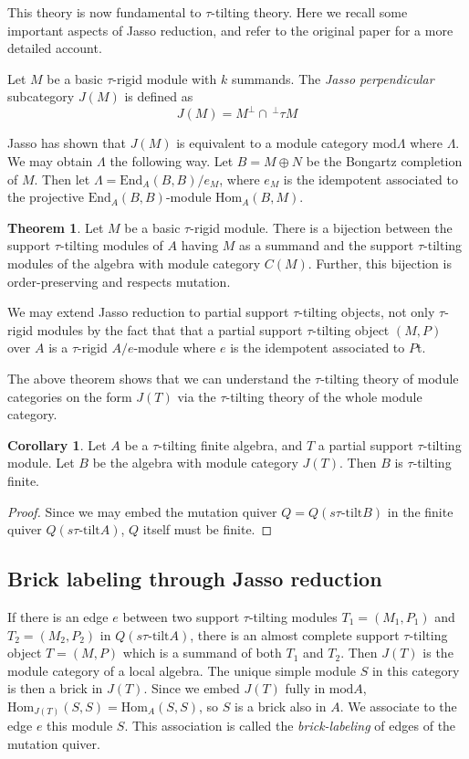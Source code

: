 \documentclass[]{article}
\theoremstyle{definition}
\newtheorem{theorem}{Theorem}[section]
\newtheorem{corollary}{Corollary}[section]
\newcommand{\tu}{\ensuremath{\tau}}
\begin{document}
This theory is now fundamental to \tu-tilting theory. Here we recall some important aspects of Jasso reduction, and refer to the original paper for a more detailed account.

Let $M$ be a basic \tu-rigid module with $k$ summands. The \textit{Jasso perpendicular} subcategory $J(M)$ is defined as \[J(M) = M^\perp \cap \, ^{\perp}\tau M\]

Jasso has shown that $J(M)$ is equivalent to a module category $\text{mod} \Lambda$ where $\Lambda$. We may obtain $\Lambda$ the following way. Let $B = M \oplus N$ be the Bongartz completion of $M$. Then let $\Lambda = \text{End}_A(B,B)/e_M$, where $e_M$ is the idempotent associated to the projective $\text{End}_A(B,B)$-module $\text{Hom}_A(B,M)$.


\begin{theorem}\cite[Theorem 3.15]{jassoreduction}
	Let $M$ be a basic \tu-rigid module. There is a bijection between the support \tu-tilting modules of $A$ having $M$ as a summand and the support \tu-tilting modules of the algebra with module category $C(M)$. Further, this bijection is order-preserving and respects mutation.
\end{theorem}

We may extend Jasso reduction to partial support \tu-tilting objects, not only \tu-rigid modules by the fact that that a partial support \tu-tilting object $(M,P)$ over $A$ is a \tu-rigid $A/e$-module where $e$ is the idempotent associated to $P$t\cite{tau}.

The above theorem shows that we can understand the \tu-tilting theory of module categories on the form $J(T)$ via the \tu-tilting theory of the whole module category. 

\begin{corollary}
	Let $A$ be a \tu-tilting finite algebra, and $T$ a partial support \tu-tilting module. Let $B$ be the algebra with module category $J(T)$. Then $B$ is \tu-tilting finite.
\end{corollary}

\begin{proof}
	Since we may embed the mutation quiver $Q = Q(s\tu\text{-tilt} B)$ in the finite quiver $Q(s\tu\text{-tilt} A)$, $Q$ itself must be finite.
\end{proof}

\subsection{Brick labeling through Jasso reduction}
If there is an edge $e$ between two support \tu-tilting modules $T_1 = (M_1,P_1)$ and $T_2 = (M_2,P_2)$ in $Q(s\tu\text{-tilt} A)$, there is an almost complete support \tu-tilting object $T = (M,P)$ which is a summand of both $T_1$ and $T_2$. Then $J(T)$ is the module category of a local algebra. The unique simple module $S$ in this category is then a brick in $J(T)$. Since we embed $J(T)$ fully in $\text{mod} A$, $\text{Hom}_{J(T)}(S,S) = \text{Hom}_A(S,S)$, so $S$ is a brick also in $A$. We associate to the edge $e$ this module $S$. This association is called the \textit{brick-labeling} of edges of the mutation quiver.
\end{document}

